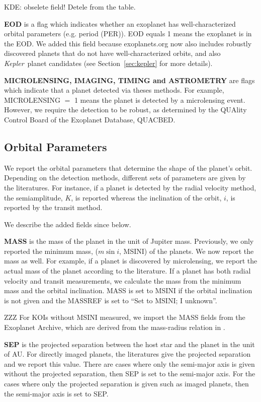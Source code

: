 \documentclass[11pt,preprint]{aastex}
\def\kepler{\textit{Kepler}}
\begin{document}
\begin{CJK*}{UTF8}{gbsn}
KDE: obselete field! Detele from the table.

{\bf EOD} is a flag which indicates whether an exoplanet has well-characterized orbital parameters (e.g. period (PER)). EOD equals 1 means the exoplanet is in the EOD. We added this field because exoplanets.org now also includes robustly discovered planets that do not have well-characterized orbits, and also \kepler\ planet candidates (see Section~\ref{sec:kepler} for more details).


{\bf MICROLENSING, IMAGING, TIMING and ASTROMETRY} are flags which indicate that a planet detected via theses methods. For example, MICROLENSING $=$ 1 means the planet is detected by a microlensing event. However, we require the detection to be robust, as determined by the QUAlity Control Board of the Exoplanet Database, QUACBED. 


\subsection{Orbital Parameters}
We report the orbital parameters that determine the shape of the planet's orbit. Depending on the detection methods, different sets of parameters are given by the literatures. For instance, if a planet is detected by the radial velocity method, the semiamplitude, $K$, is reported whereas the inclination of the orbit, $i$, is reported by the transit method. 

We describe the added fields since \cite{Wright2011} below. 


{\bf MASS} is the mass of the planet in the unit of Jupiter mass. Previously, we only reported the minimum mass, ($m\sin{i}$, MSINI) of the planets. We now report the mass as well. For example, if a planet is discovered by microlensing, we report the actual mass of the planet according to the literature. 
If a planet has both radial velocity and transit measurements, we calculate the mass from the minimum mass and the orbital inclination. MASS is set to MSINI if the orbital inclination is not given and the MASSREF is set to ``Set to MSINI; I unknown''. 

ZZZ For KOIs without MSINI measured, we import the MASS fields from the Exoplanet Archive, which are derived from the mass-radius relation in . 


{\bf SEP} is the projected separation between the host star and the planet in the unit of AU. For directly imaged planets, the literatures give the projected separation and we report this value. There are cases where only the semi-major axis is given without the projected separation, then SEP is set to the semi-major axis. For the cases where only the projected separation is given such as imaged planets, then the semi-major axis is set to SEP. 


\end{CJK*}
\end{document}
